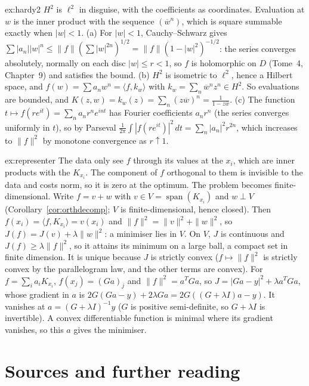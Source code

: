 \begin{solution}{ex:hardy2}
\idea $H^2$ is $\ell^2$ in disguise, with the coefficients as coordinates. Evaluation at $w$ is the inner product with the sequence $(\overline w^n)$, which is square summable exactly when $|w|<1$.
\writeup (a) For $|w|<1$, Cauchy--Schwarz gives $\sum|a_n||w|^n\le\|f\|(\sum|w|^{2n})^{1/2}=\|f\|(1-|w|^2)^{-1/2}$: the series converges absolutely, normally on each disc $|w|\le r<1$, so $f$ is holomorphic on $D$ (Tome~4, Chapter~9) and
satisfies the bound. (b) $H^2$ is isometric to $\ell^2$, hence a Hilbert space, and $f(w)=\sum a_nw^n=\langle f,k_w\rangle$ with $k_w=\sum_n\overline w^nz^n\in H^2$. So evaluations are bounded, and $K(z,w)=k_w(z)=\sum_n(z\overline w)^n=\frac1{1-z\overline w}$.
(c) The function $t\mapsto f(re^{it})=\sum_na_nr^ne^{int}$ has Fourier coefficients $a_nr^n$ (the series converges uniformly in $t$), so by Parseval $\frac1{2\pi}\int|f(re^{it})|^2\,dt=\sum_n|a_n|^2r^{2n}$, which increases to $\|f\|^2$ by
monotone convergence as $r\uparrow1$.
\end{solution}

\begin{solution}{ex:representer}
\idea The data only see $f$ through its values at the $x_i$, which are inner products with the $K_{x_i}$. The component of $f$ orthogonal to them is invisible to the data and costs norm, so it is zero at the optimum.
The problem becomes finite-dimensional.
\writeup Write $f=v+w$ with $v\in V=\operatorname{span}(K_{x_i})$ and $w\perp V$ (Corollary~\ref{cor:orthdecomp}; $V$ is finite-dimensional, hence closed). Then $f(x_i)=\langle f,K_{x_i}\rangle=v(x_i)$ and $\|f\|^2=\|v\|^2+\|w\|^2$, so
$J(f)=J(v)+\lambda\|w\|^2$: a minimiser lies in $V$. On $V$, $J$ is continuous and $J(f)\ge\lambda\|f\|^2$, so it attains its minimum on a large ball, a compact set in finite dimension. It is unique because $J$ is strictly
convex ($f\mapsto\|f\|^2$ is strictly convex by the parallelogram law, and the other terms are convex). For $f=\sum_ia_iK_{x_i}$, $f(x_j)=(Ga)_j$ and $\|f\|^2=a^TGa$, so $J=|Ga-y|^2+\lambda a^TGa$, whose gradient in $a$ is
$2G(Ga-y)+2\lambda Ga=2G((G+\lambda I)a-y)$. It vanishes at $a=(G+\lambda I)^{-1}y$ ($G$ is positive semi-definite, so $G+\lambda I$ is invertible). A convex differentiable function is minimal where its gradient vanishes, so
this $a$ gives the minimiser.
\end{solution}

\section*{Sources and further reading}

